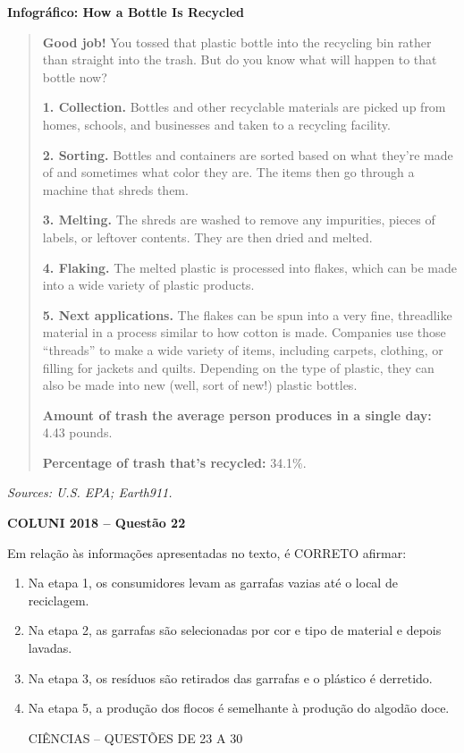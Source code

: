 \textbf{Infográfico: How a Bottle Is Recycled}

\begin{quote}
\textbf{Good job!} You tossed that plastic bottle into the recycling bin rather than straight into the trash. But do you know what will happen to that bottle now?

\textbf{1. Collection.} Bottles and other recyclable materials are picked up from homes, schools, and businesses and taken to a recycling facility.

\textbf{2. Sorting.} Bottles and containers are sorted based on what they're made of and sometimes what color they are. The items then go through a machine that shreds them.

\textbf{3. Melting.} The shreds are washed to remove any impurities, pieces of labels, or leftover contents. They are then dried and melted.

\textbf{4. Flaking.} The melted plastic is processed into flakes, which can be made into a wide variety of plastic products.

\textbf{5. Next applications.} The flakes can be spun into a very fine, threadlike material in a process similar to how cotton is made. Companies use those ``threads'' to make a wide variety of items, including carpets, clothing, or filling for jackets and quilts. Depending on the type of plastic, they can also be made into new (well, sort of new!) plastic bottles.

\textbf{Amount of trash the average person produces in a single day:} 4.43 pounds.

\textbf{Percentage of trash that's recycled:} 34.1\%.
\end{quote}

\textit{Sources: U.S. EPA; Earth911.}

\textbf{COLUNI 2018 -- Questão 22}\par\medskip Em relação às informações apresentadas no texto, é CORRETO afirmar:\begin{enumerate}
\item Na etapa 1, os consumidores levam as garrafas vazias até o local de reciclagem.
\item Na etapa 2, as garrafas são selecionadas por cor e tipo de material e depois lavadas.
\item Na etapa 3, os resíduos são retirados das garrafas e o plástico é derretido.
\item Na etapa 5, a produção dos flocos é semelhante à produção do algodão doce.

CIÊNCIAS – QUESTÕES DE 23 A 30\end{enumerate}
